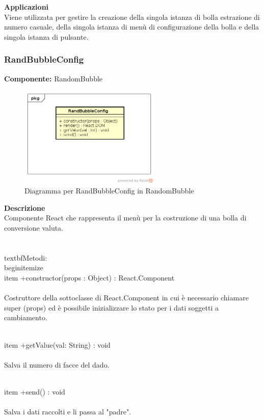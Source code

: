 \textbf{Applicazioni}\\
Viene utilizzata per gestire la creazione della singola istanza di bolla estrazione di numero casuale, della singola istanza di menù di configurazione della bolla e della singola istanza di pulsante. 


\clearpage

\subsubsection{RandBubbleConfig}
\textbf{Componente:}  RandomBubble\\
   \FloatBarrier
   \begin{figure}[ht]
   \centering
   \includegraphics[width=0.6\textwidth]{img/single-RandBubbleConfig}
   \caption{{Diagramma per RandBubbleConfig in RandomBubble}}
\end{figure}
\FloatBarrier
\textbf{Descrizione}\\
Componente React che rappresenta il menù per la costruzione di una bolla di conversione valuta.
\\\\
\\textbf{Metodi:} 
\\begin{itemize}
\\item +constructor(props : Object) : React.Component 
\\\\
Costruttore della sottoclasse di React.Component in cui è necessario chiamare super (props) ed è possibile inizializzare lo stato per i dati soggetti a cambiamento.

\\item +getValue(val: String) : void 
\\\\
Salva il numero di facce del dado.

\\item +send() : void 
\\\\
Salva i dati raccolti e li passa al "padre".

